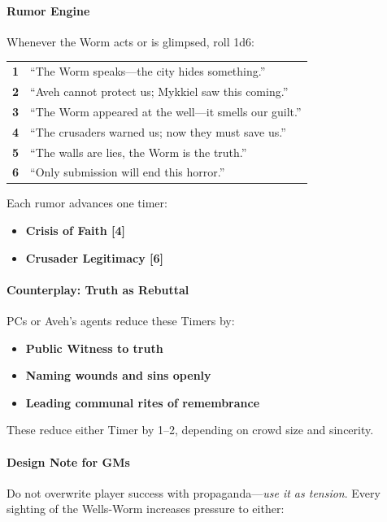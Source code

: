 \documentclass[11pt]{article}
\begin{document}
\paragraph{Rumor Engine}
Whenever the Worm acts or is glimpsed, roll 1d6:

\begin{longtable}{>{\bfseries}c|p{9cm}}
1 & ``The Worm speaks---the city hides something.'' \\
2 & ``Aveh cannot protect us; Mykkiel saw this coming.'' \\
3 & ``The Worm appeared at the well---it smells our guilt.'' \\
4 & ``The crusaders warned us; now they must save us.'' \\
5 & ``The walls are lies, the Worm is the truth.'' \\
6 & ``Only submission will end this horror.'' \\
\end{longtable}

Each rumor advances one timer:

\begin{itemize}
  \item \textbf{Crisis of Faith [4]}
  \item \textbf{Crusader Legitimacy [6]}
\end{itemize}

\paragraph{Counterplay: Truth as Rebuttal}
PCs or Aveh's agents reduce these Timers by:

\begin{itemize}
  \item \textbf{Public Witness to truth}
  \item \textbf{Naming wounds and sins openly}
  \item \textbf{Leading communal rites of remembrance}
\end{itemize}

These reduce either Timer by 1--2, depending on crowd size and sincerity.

\paragraph{Design Note for GMs}
Do not overwrite player success with propaganda---\emph{use it as tension}.  
Every sighting of the Wells-Worm increases pressure to either:
\end{document}
